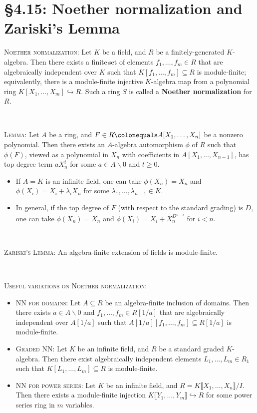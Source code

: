 \documentclass[12pt]{amsart}
\newcommand{\1}{\mathbbm{1}}
\newcommand{\showsol}[1]{\def\displaysol{#1}}
\newcommand\ceq{\colonequals}
\begin{document}
\showsol{1}
	
	\thispagestyle{empty}
	
	\section*{\S4.15: Noether normalization and Zariski's Lemma}	

\begin{framed}

\noindent \textsc{Noether normalization:} Let $K$ be a field, and $R$ be a finitely-generated $K$-algebra. Then there exists a finite\footnotemark\,set of elements $f_1,\dots,f_m\in R$ that are algebraically independent over $K$ such that $K[f_1,\dots,f_m] \subseteq R$ is module-finite; equivalently, there is a module-finite injective $K$-algebra map from a polynomial ring ${K[X_1,\dots,X_m] \hookrightarrow R}$. Such a ring $S$ is called a \textbf{Noether normalization} for~$R$.

\

\noindent \textsc{Lemma:} Let $A$ be a ring, and $F \in R \ceq A[X_1,\dots,X_n]$ be a nonzero polynomial. Then there exists an $A$-algebra automorphism $\phi$ of $R$ such that $\phi(F)$, viewed as a polynomial in $X_n$ with coefficients in $A[X_1,\dots, X_{n-1}]$, has top degree term $a X_n^t$ for some $a\in A\smallsetminus 0$ and $t\geq 0$.
\begin{itemize}
\item If $A=K$ is an infinite field, one can take $\phi(X_n)=X_n$ and $\phi(X_i) = X_i +\lambda_i X_n$ for some $\lambda_1,\dots,\lambda_{n-1} \in K$.
\item In general, if the top degree of $F$ (with respect to the standard grading) is $D$, one can take $\phi(X_n) = X_n$ and $\phi(X_i) = X_i + X_n^{D^{n-i}}$ for $i<n$.
\end{itemize}

\


\noindent \textsc{Zariski's Lemma:} An algebra-finite extension of fields is module-finite.

\

\noindent \textsc{Useful variations on Noether normalization:}
\begin{itemize}
\item \textsc{NN for domains:} Let $A\subseteq R$ be an algebra-finite inclusion of domains\footnotemark. Then there exists $a\in A\smallsetminus 0$ and $f_1,\dots,f_m\in R[1/a]$ that are algebraically independent over $A[1/a]$ such that $A[1/a][f_1,\dots,f_m] \subseteq R[1/a]$ is module-finite.
\item \textsc{Graded NN:} Let $K$ be an infinite field, and $R$ be a standard graded $K$-algebra. Then there exist algebraically independent elements $L_1,\dots,L_m \in R_1$ such that $K[L_1,\dots,L_m] \subseteq R$ is module-finite.
\item \textsc{NN for power series:} Let $K$ be an infinite field, and $R=K\llbracket X_1,\dots,X_n \rrbracket / I$. Then there exists a module-finite injection $K\llbracket Y_1,\dots,Y_m \rrbracket \hookrightarrow R$ for some power series ring in $m$ variables.
\end{itemize}

 \end{framed}
\end{document}
